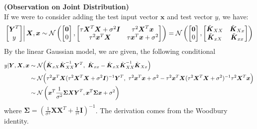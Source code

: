 \begin{remark}{\textbf{(Observation on Joint Distribution)}}
\begin{equation*}
    \end{equation*}
    If we were to consider adding the test input vector $\boldsymbol x$ and test vector $y$, we have:
    \begin{equation*}
        \left.\begin{bmatrix}
            \boldsymbol Y^T \\ y
        \end{bmatrix}\right| \boldsymbol X, \boldsymbol x \sim \mathcal{N}\left( \begin{bmatrix}
            \boldsymbol 0 \\ 0
        \end{bmatrix}, \begin{bmatrix}
            \tau \boldsymbol X^T\boldsymbol X + \sigma^2\boldsymbol I & \tau^2 \boldsymbol X^T\boldsymbol x \\
            \tau^2 \boldsymbol x^T\boldsymbol X & \tau \boldsymbol x^T\boldsymbol x + \sigma^2
        \end{bmatrix} \right) = \mathcal{N}\left( \begin{bmatrix}
            \boldsymbol 0 \\ 0
        \end{bmatrix}, \begin{bmatrix}
            \tilde{\boldsymbol K}_{XX} & \tilde{\boldsymbol K}_{Xx} \\
            \tilde{\boldsymbol K}_{xX} & \tilde{\boldsymbol K}_{xx} \\
        \end{bmatrix} \right)
    \end{equation*}
    By the linear Gaussian model, we are given, the following conditional
    \begin{equation*}
    \begin{aligned}
        y | \boldsymbol Y, \boldsymbol X, \boldsymbol x &\sim \mathcal{N}\Big( \tilde{\boldsymbol K}_{xX}\tilde{\boldsymbol K}_{XX}^{-1}\boldsymbol Y^T, \ \tilde{\boldsymbol K}_{xx} - \tilde{\boldsymbol K}_{xX}\tilde{\boldsymbol K}_{XX}^{-1}\tilde{\boldsymbol K}_{Xx} \Big) \\
        &\sim \mathcal{N}\Big( \tau^2\boldsymbol x^T\boldsymbol X(\tau^2 \boldsymbol X^T\boldsymbol X + \sigma^2 \boldsymbol I)^{-1}\boldsymbol Y^T, \ \tau^2\boldsymbol x^T\boldsymbol x + \sigma^2 - \tau^2\boldsymbol x^T\boldsymbol X(\tau^2\boldsymbol X^T\boldsymbol X + \sigma^2)^{-1}\tau^2\boldsymbol X^T\boldsymbol x \Big) \\
        &\sim \mathcal{N}\left(  \boldsymbol x^T\frac{1}{\sigma^2} \boldsymbol \Sigma\boldsymbol X\boldsymbol Y^T, \boldsymbol x^T\boldsymbol \Sigma\boldsymbol x + \sigma^2  \right)
    \end{aligned}
    \end{equation*}
    where $\boldsymbol \Sigma = (\frac{1}{\sigma^2}\boldsymbol X\boldsymbol X^T + \frac{1}{\tau^2}\boldsymbol I)^{-1}$. The derivation comes from the Woodbury identity. 
\end{remark}

